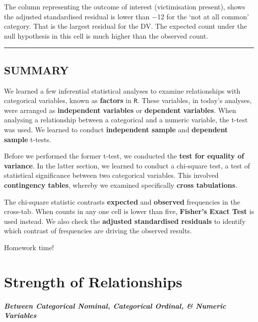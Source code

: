 \documentclass[
]{book}
\begin{document}
The column representing the outcome of interest (victimisation present), shows the adjusted standardised residual is lower than −12 for the `not at all common' category. That is the largest residual for the DV. The expected count under the null hypothesis in this cell is much higher than the observed count.

\begin{center}\rule{0.5\linewidth}{0.5pt}\end{center}

\hypertarget{summary-6}{%
\section{SUMMARY}\label{summary-6}}

We learned a few inferential statistical analyses to examine relationships with categorical variables, known as \textbf{factors} in \texttt{R}. These variables, in today's analyses, were arranged as \textbf{independent variables} or \textbf{dependent variables}. When analysing a relationship between a categorical and a numeric variable, the t-test was used. We learned to conduct \textbf{independent sample} and \textbf{dependent sample} t-tests.

Before we performed the former t-test, we conducted the \textbf{test for equality of variance}. In the latter section, we learned to conduct a chi-square test, a test of statistical significance between two categorical variables. This involved \textbf{contingency tables}, whereby we examined specifically \textbf{cross tabulations}.

The chi-square statistic contrasts \textbf{expected} and \textbf{observed} frequencies in the cross-tab. When counts in any one cell is lower than five, \textbf{Fisher's Exact Test} is used instead. We also check the \textbf{adjusted standardised residuals} to identify which contrast of frequencies are driving the observed results.

Homework time!

\hypertarget{strength-of-relationships}{%
\chapter{Strength of Relationships}\label{strength-of-relationships}}

\hypertarget{between-categorical-nominal-categorical-ordinal-numeric-variables}{%
\subsubsection*{\texorpdfstring{\emph{Between Categorical Nominal, Categorical Ordinal, \& Numeric Variables}}{Between Categorical Nominal, Categorical Ordinal, \& Numeric Variables}}\label{between-categorical-nominal-categorical-ordinal-numeric-variables}}
\end{document}
